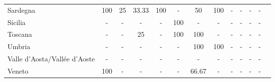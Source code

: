 \begin{table}[H]
\begin{tabularx}{\textwidth}{Xcccccccccccc}
            Sardegna & 100 & 25 & 33.33 & 100 & - & 50 & 100 & - & - & - & - \\
            Sicilia & - & - & - & - & 100 & - & - & - & - & - & - \\
            Toscana & - & - & 25 & - & 100 & 100 & - & - & - & - & - \\
            Umbria & - & - & - & - & - & 100 & 100 & - & - & - & - \\
            Valle d’Aosta/Vallée d’Aoste & - & - & - & - & - & - & - & - & - & - & - \\
            Veneto & 100 & - & - & - & - & 66.67 & - & - & - & - & - \\
        \bottomrule
    \end{tabularx}
\end{table}
    